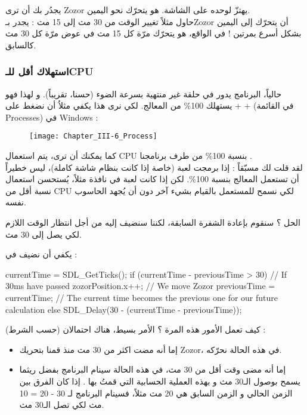يجدُر بك أن ترى
\textenglish{Zozor}
يهتزّ لوحده على الشاشة. هو يتحرّك نحو اليمين. \\
حاول مثلاً تغيير الوقت من 30 مث إلى 15 مث : يجدر بـ\textenglish{Zozor}
أن يتحرّك إلى اليمين بشكل أسرع بمرتين ! في الواقع، هو يتحرّك مرّة كل 15 مث في عوض مرّة كل 30 مث كالسابق.

\subsubsection{استهلاك أقل للـ\textenglish{CPU}}

حالياً، البرنامج يدور في حلقة غير منتهية بسرعة الضوء (حسنا، تقريباً). و لهذا فهو يستهلك 100\% من المعالج. لكي نرى هذا يكفي مثلاُ أن نضغط على 
 +  + 
(في القائمة
\textenglish{Processes})
في
\textenglish{Windows} :

\begin{figure}[H]
	\centering
	\texttt{[image: Chapter\_III-6\_Process]}
\end{figure}

كما يمكنك أن ترى، يتم استعمال
\textenglish{CPU}
بنسبة 100\% من طرف برنامجنا
.\\
لقد قلت لك مسبّقاً : إذا برمجت لعبة (خاصة إذا كانت بنظام شاشة كاملة)، ليس خطيراً أن تستعمل المعالج بنسبة 100\%. لكن إذا كانت لعبة في نافذة مثلاً، يُستحسن استعمال نسبة أقل من
\textenglish{CPU}
لكي نسمح للمستعمل بالقيام بشيء آخر دون أن يُجهد الحاسوب نفسه.

الحل ؟ سنقوم بإعادة الشفرة السابقة، لكننا سنضيف إليه
من أجل انتظار الوقت اللازم لكي يصل إلى 30 مث.

يكفي أن نضيف
في 
 :

\begin{Csource}
currentTime = SDL_GetTicks();
if (currentTime - previousTime > 30) // If 30ms have passed
{
	zozorPosition.x++; // We move Zozor
	previousTime = currentTime; // The current time becomes the previous one for our future calculation
}
else
{
	SDL_Delay(30 - (currentTime - previousTime));
}
\end{Csource}

كيف تعمل الأمور هذه المرة ؟ الأمر بسيط، هناك احتمالان (حسب الشرط) :

\begin{itemize}
	\item إما أنه مضت اكثر من 30 مث منذ قمنا بتحريك
	\textenglish{Zozor}،
	في هذه الحالة نحرّكه.
	\item إما أنه مضى وقت أقل من 30 مث، في هذه الحالة سينام البرنامج بفضل
	ريثما يسمح بوصول الـ30 مث و بهذه العملية الحسابية التي قمتُ بها
	.
	إذا كان الفرق بين الزمن الحالي و الزمن السابق هي 20 مث مثلاً، فسينام البرنامج لـ
	30 - 20 = 10
	مث لكي تصل الـ30 مث.
\end{itemize}

